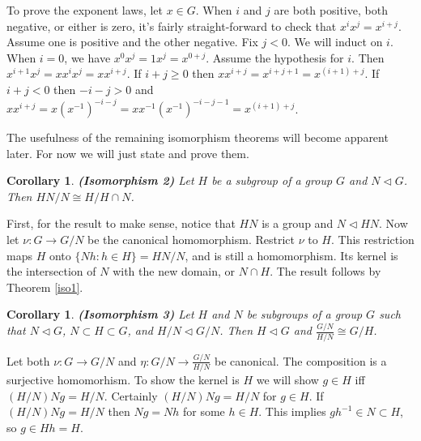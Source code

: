 \documentclass[letterpaper]{article}
\newtheorem{corollary}[theorem]{Corollary}
\newenvironment{proof}[1][Proof]{\begin{trivlist}
\item[\hskip \labelsep {\bfseries #1}]}{\end{trivlist}}
\begin{document}
To prove the exponent laws, let $x \in G$. When $i$ and $j$ are both positive, both negative, or either is zero, it's fairly straight-forward to check that $x^ix^j = x^{i+j}$. Assume one is positive and the other negative. Fix $j < 0$. We will induct on $i$. When $i = 0$, we have $x^0x^j = 1x^j = x^{0+j}$. Assume the hypothesis for $i$. Then $x^{i+1}x^j = xx^ix^j = xx^{i+j}$. If $i + j \geq 0$ then $xx^{i+j} = x^{i+j+1} = x^{(i+1)+j}$. If $i + j < 0$ then $-i -j > 0$ and $xx^{i+j} = x(x^{-1})^{-i - j} = xx^{-1}(x^{-1})^{-i -j -1} = x^{(i+1) + j}$.

The usefulness of the remaining isomorphism theorems will become apparent later. For now we will just state and prove them.

\begin{corollary}
\label{iso2}
\emph{\textbf{(Isomorphism 2)}}
Let $H$ be a subgroup of a group $G$ and $N \lhd G$.  Then $HN/N \cong H/{H \cap N}$.
\end{corollary}
\begin{proof}
First, for the result to make sense, notice that $HN$ is a group and $N \lhd HN$.  Now let $\nu \colon G \rightarrow G/N$ be the canonical homomorphism. Restrict $\nu$ to $H$. This restriction maps $H$ onto $\{Nh \colon h \in H\} = HN/N$, and is still a homomorphism. Its kernel is the intersection of $N$ with the new domain, or $N \cap H$. The result follows by Theorem \ref{iso1}.
\end{proof}

\begin{corollary}
\label{iso3}
\emph{\textbf{(Isomorphism 3)}}
Let $H$ and $N$ be subgroups of a group $G$ such that $N \lhd G$, $N \subset H \subset G$, and $H/N \lhd G/N$. Then $H \lhd G$ and $\frac{G/N}{H/N} \cong G/H$.
\end{corollary}
\begin{proof}
Let both $\nu \colon G \rightarrow G/N$ and $\eta \colon G/N \rightarrow \frac{G/N}{H/N}$ be canonical. The composition is a surjective homomorhism. To show the kernel is $H$ we will show $g \in H$ iff $(H/N)Ng = H/N$. Certainly $(H/N)Ng = H/N$ for $g \in H$. If $(H/N)Ng = H/N$ then $Ng = Nh$ for some $h \in H$. This implies $gh^{-1} \in N \subset H$, so $g \in Hh = H$.
\end{proof}
\end{document}
